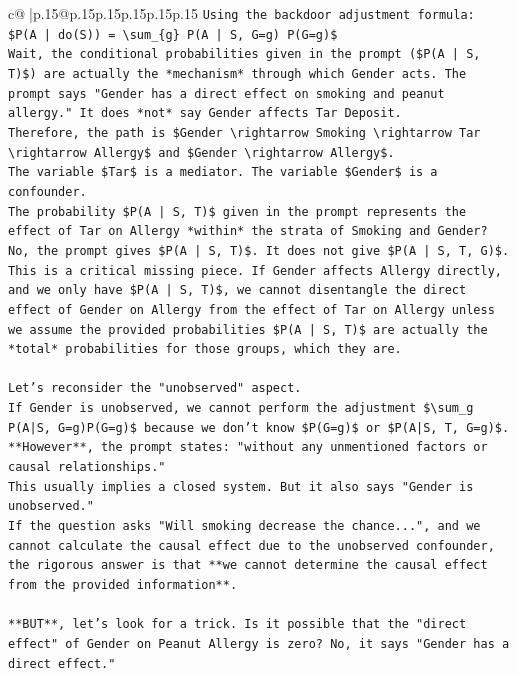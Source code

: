\documentclass{article}
\begin{document}
{\begin{supertabular}{c@{$\;$}|p{.15\linewidth}@{}p{.15\linewidth}p{.15\linewidth}p{.15\linewidth}p{.15\linewidth}p{.15\linewidth}}
{{{\texttt{Using the backdoor adjustment formula:} \\
\texttt{\$P(A | do(S)) = \textbackslash{}sum\_\{g\} P(A | S, G=g) P(G=g)\$} \\
\texttt{Wait, the conditional probabilities given in the prompt (\$P(A | S, T)\$) are actually the *mechanism* through which Gender acts. The prompt says "Gender has a direct effect on smoking and peanut allergy." It does *not* say Gender affects Tar Deposit.} \\
\texttt{Therefore, the path is \$Gender \textbackslash{}rightarrow Smoking \textbackslash{}rightarrow Tar \textbackslash{}rightarrow Allergy\$ and \$Gender \textbackslash{}rightarrow Allergy\$.} \\
\texttt{The variable \$Tar\$ is a mediator. The variable \$Gender\$ is a confounder.} \\
\texttt{The probability \$P(A | S, T)\$ given in the prompt represents the effect of Tar on Allergy *within* the strata of Smoking and Gender? No, the prompt gives \$P(A | S, T)\$. It does not give \$P(A | S, T, G)\$.} \\
\texttt{This is a critical missing piece. If Gender affects Allergy directly, and we only have \$P(A | S, T)\$, we cannot disentangle the direct effect of Gender on Allergy from the effect of Tar on Allergy unless we assume the provided probabilities \$P(A | S, T)\$ are actually the *total* probabilities for those groups, which they are.} \\
\\ 
\texttt{Let's reconsider the "unobserved" aspect.} \\
\texttt{If Gender is unobserved, we cannot perform the adjustment \$\textbackslash{}sum\_g P(A|S, G=g)P(G=g)\$ because we don't know \$P(G=g)\$ or \$P(A|S, T, G=g)\$.} \\
\texttt{**However**, the prompt states: "without any unmentioned factors or causal relationships."} \\
\texttt{This usually implies a closed system. But it also says "Gender is unobserved."} \\
\texttt{If the question asks "Will smoking decrease the chance...", and we cannot calculate the causal effect due to the unobserved confounder, the rigorous answer is that **we cannot determine the causal effect from the provided information**.} \\
\\ 
\texttt{**BUT**, let's look for a trick. Is it possible that the "direct effect" of Gender on Peanut Allergy is zero? No, it says "Gender has a direct effect."} \\
}}}
\end{supertabular}}
\end{document}

